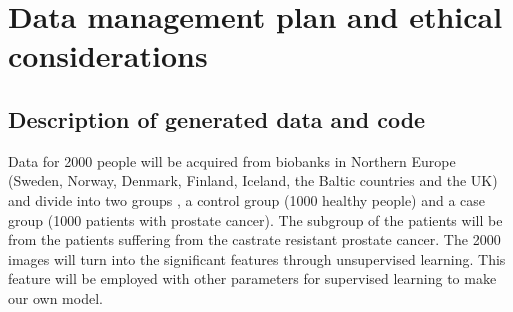 \documentclass[11pt]{article}
\begin{document}
\newpage


\section{Data management plan and ethical considerations} %


\subsection{Description of generated data and code}




 Data for 2000 people will be acquired from biobanks in Northern Europe (Sweden, Norway, Denmark, Finland, Iceland, the Baltic countries and the UK) and divide into two groups , a control group (1000 healthy people) and a case group (1000 patients with prostate cancer). The subgroup of the patients will be from the patients suffering from the castrate resistant prostate cancer. The 2000 images will turn into the significant features through unsupervised learning. This feature will be employed with other parameters for supervised learning to make our own model.
 
\end{document}

